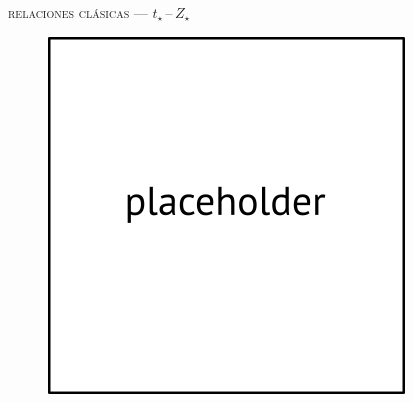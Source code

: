 \documentclass[xcolor=dvipsnames,4pt,hyperref={colorlinks,citecolor=black,linkcolor=black,urlcolor=black}]{beamer}
\begin{document}
\begin{frame}{\textsc{relaciones clásicas --- $t_\star\,$--$\,Z_\star$}}
%
\begin{figure}
\includegraphics[scale=1]{img/placeholder}
\end{figure}
\end{frame}
\end{document}
